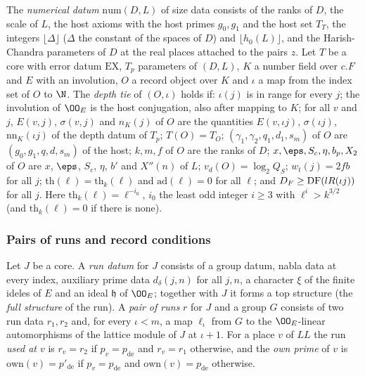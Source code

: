 \begin{definition}\label{pf:onto3:runtie}
The \emph{numerical datum} $\mathrm{num}(D,L)$ of size data consists of the ranks of $D$, the scale of $L$, the host
axioms with the host primes $g_0,g_1$ and the host set $T_T$, the integers $\lfloor\Delta\rfloor$ ($\Delta$ the
constant of the spaces of $D$) and $\lfloor h_0(L)\rfloor$, and the Harish-Chandra parameters of $D$ at the real places
attached to the pairs $z$. Let $T$ be a core with error datum $\mathrm{EX}$, $T_p$ parameters of $(D,L)$, $K$ a number
field over $c.F$ and $E$ with an involution, $O$ a record object over $K$ and $\iota$ a map from the index set of $O$ to
$\N$. The \emph{depth tie} of $(O,\iota)$ holds if: $\iota(j)$ is in range for every $j$; the involution of $\OO_E$ is the
host conjugation, also after mapping to $K$; for all $v$ and $j$, $E(v,j)$, $\sigma(v,j)$ and $n_K(j)$ of $O$ are the
quantities $E(v,\iota j)$, $\sigma(\iota j)$, $\mathrm{nn}_K(\iota j)$ of the depth datum of $T_p$; $T(O)=T_O$;
$(\gamma_1,\gamma_2,q_1,d_1,s_m)$ of $O$ are $(g_0,g_1,q,d,s_m)$ of the host; $k,m,f$ of $O$ are the ranks of $D$; $x,\eps,
S_c,\eta,b_p,X_2$ of $O$ are $x$, $\eps$, $S_c$, $\eta$, $b'$ and $X''(n)$ of $L$; $v_d(O)=\log_2Q_S$; $w_t(j)=2fb$ for all
$j$; $\mathrm{th}(\ell)=\mathrm{th}_k(\ell)$ and $\mathrm{ad}(\ell)=0$ for all $\ell$; and $D_F\ge\operatorname{DF}(lR(\iota j))$
for all $j$. Here $\mathrm{th}_k(\ell)=\ell^{-i_0}$, $i_0$ the least odd integer $i\ge3$ with $\ell^i>k^{3/2}$ (and
$\mathrm{th}_k(\ell)=0$ if there is none).
\end{definition}

\subsubsection{Pairs of runs and record conditions}

\begin{definition}\label{pf:onto3:tworuns}
Let $J$ be a core. A \emph{run datum} for $J$ consists of a group datum, nabla data at every index, auxiliary prime
data $d_\delta(j,n)$ for all $j,n$, a character $\xi$ of the finite ideles of $E$ and an ideal $\mathfrak h$ of $\OO_E$;
together with $J$ it forms a top structure (the \emph{full structure} of the run). A \emph{pair of runs} $r$ for $J$
and a group $G$ consists of two run data $r_1,r_2$ and, for every $\iota<m$, a map $\ell_\iota$ from $G$ to the
$\OO_E$-linear automorphisms of the lattice module of $J$ at $\iota+1$. For a place $v$ of $\mathit{LL}$ the run
\emph{used at $v$} is $r_v=r_2$ if $p_v=p_{\mathrm{de}}$ and $r_v=r_1$ otherwise, and the \emph{own prime} of $v$ is
$\mathrm{own}(v)=p'_{\mathrm{de}}$ if $p_v=p_{\mathrm{de}}$ and $\mathrm{own}(v)=p_{\mathrm{de}}$ otherwise.
\end{definition}

